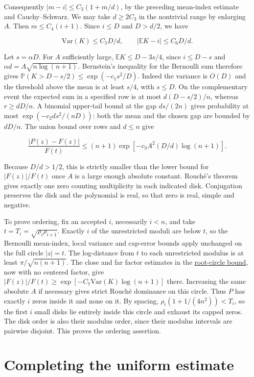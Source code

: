 \documentclass[11pt]{article}
\begin{document}
Consequently $|m-i|\le C_3(1+m/d)$, by the preceding mean-index estimate and Cauchy--Schwarz. We may take $d\ge2C_3$ in the nontrivial range by enlarging $A$. Then $m\le C_4(i+1)$. Since $i\le D$ and $D>d/2$, we have

\[
\mathrm{Var}(K)\le C_5D/d,\qquad
|\mathbb E K-i|\le C_6D/d.
\]

Let $s=\alpha D$. For $A$ sufficiently large, $\mathbb E K\le D-3s/4$, since $i\le D-s$ and $\alpha d=A\sqrt{n\log(n+1)}$. Bernstein's inequality for the Bernoulli sum therefore gives $\mathbb P(K>D-s/2)\le\exp(-c_1s^2/D)$. Indeed the variance is $O(D)$ and the threshold above the mean is at least $s/4$, with $s\le D$. On the complementary event the expected sum in a specified row is at most $d(D-s/2)/n$, whereas $r\ge dD/n$. A binomial upper-tail bound at the gap $ds/(2n)$ gives probability at most $\exp(-c_2ds^2/(nD))$: both the mean and the chosen gap are bounded by $dD/n$. The union bound over rows and $d\le n$ give

\[
\frac{|P(z)-F(z)|}{F(t)}
\le (n+1)\exp[-c_3A^2(D/d)\log(n+1)].
\]

Because $D/d>1/2$, this is strictly smaller than the lower bound for $|F(z)|/F(t)$ once $A$ is a large enough absolute constant. Rouch\'e's theorem gives exactly one zero counting multiplicity in each indicated disk. Conjugation preserves the disk and the polynomial is real, so that zero is real, simple and negative.

To prove ordering, fix an accepted $i$, necessarily $i<n$, and take
$t=T_i=\sqrt{\rho_i\rho_{i+1}}$. Exactly $i$ of the unrestricted moduli
are below $t$, so the Bernoulli mean-index, local variance and cap-error
bounds apply unchanged on the full circle $|z|=t$. The log-distance
from $t$ to each unrestricted modulus is at least
$\pi/\sqrt{n(n+1)}$. The close and far factor estimates in the
\hyperref[app:full]{root-circle bound}, now with no centered factor,
give $|F(z)|/F(t)\ge\exp[-C_7\mathrm{Var}(K)\log(n+1)]$ there.
Increasing the same absolute $A$ if necessary gives strict
Rouch\'e dominance on this circle. Thus $P$ has exactly $i$ zeros
inside it and none on it. By spacing, $\rho_i(1+1/(4n^2))<T_i$,
so the first $i$ small disks lie entirely inside this circle and
exhaust its capped zeros. The disk order is also their modulus
order, since their modulus intervals are pairwise disjoint.
This proves the ordering assertion.

\section{Completing the uniform estimate}
\end{document}
